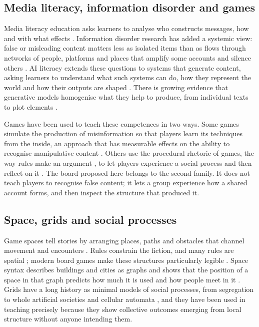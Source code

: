 \documentclass[12pt]{article}
\begin{document}
\subsection{Media literacy, information disorder and games}

Media literacy education asks learners to analyse who constructs messages,
how and with what effects \parencite{hobbs2010}. Information disorder
research has added a systemic view: false or misleading content matters less
as isolated items than as flows through networks of people, platforms and
places that amplify some accounts and silence others \parencite{wardle2017}.
AI literacy extends these questions to systems that generate content,
asking learners to understand what such systems can do, how they represent
the world and how their outputs are shaped \parencite{long2020,unesco2024}.
There is growing evidence that generative models homogenise what they help
to produce, from individual texts to plot elements
\parencite{doshi2024,padmakumar2024,xu2025,begus2024}.

Games have been used to teach these competences in two ways. Some games
simulate the production of misinformation so that players learn its
techniques from the inside, an approach that has measurable effects on the
ability to recognise manipulative content \parencite{roozenbeek2019,basol2020}.
Others use the procedural rhetoric of games, the way rules make an argument
\parencite{bogost2007}, to let players experience a social process and then
reflect on it \parencite{flanagan2009,flanagan2014}. The board proposed here
belongs to the second family. It does not teach players to recognise false
content; it lets a group experience how a shared account forms, and then
inspect the structure that produced it.

\subsection{Space, grids and social processes}

Game spaces tell stories by arranging places, paths and obstacles that
channel movement and encounters \parencite{jenkins2004}. Rules constrain the
fiction, and many rules are spatial \parencite{juul2005,salen2004}; modern
board games make these structures particularly legible
\parencite{woods2012}. Space syntax describes buildings and cities as graphs
and shows that the position of a space in that graph predicts how much it is
used and how people meet in it \parencite{hillier1984}. Grids have a long
history as minimal models of social processes, from segregation
\parencite{schelling1971} to whole artificial societies
\parencite{epstein1996} and cellular automata \parencite{wolfram1984}, and
they have been used in teaching precisely because they show collective
outcomes emerging from local structure without anyone intending them.
\end{document}
